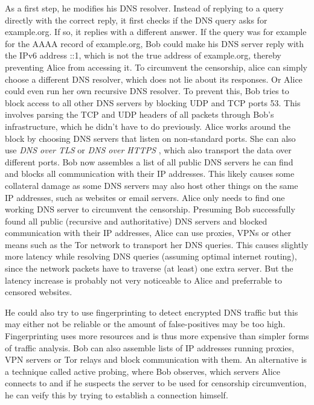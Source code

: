 As a first step, he modifies his DNS resolver.
Instead of replying to a query directly with the correct reply, it first checks if the DNS query asks for example.org.
If so, it replies with a different answer.
If the query was for example for the AAAA record of example.org, Bob could make his DNS server reply with the IPv6 address ::1, which is not the true address of example.org, thereby preventing Alice from accessing it.
To circumvent the censorship, alice can simply choose a different DNS resolver, which does not lie about its responses.
Or Alice could even run her own recursive DNS resolver.
To prevent this, Bob tries to block access to all other DNS servers by blocking UDP and TCP ports 53.
This involves parsing the TCP and UDP headers of all packets through Bob's infrastructure, which he didn't have to do previously.
Alice works around the block by choosing DNS servers that listen on non-standard ports.
She can also use \textit{DNS over TLS} \cite{wiki:DNS_over_TLS} or \textit{DNS over HTTPS} \cite{wiki:DNS_over_HTTPS}, which also transport the data over different ports.
Bob now assembles a list of all public DNS servers he can find and blocks all communication with their IP addresses.
This likely causes some collateral damage as some DNS servers may also host other things on the same IP addresses, such as websites or email servers.
Alice only needs to find one working DNS server to circumvent the censorship.
Presuming Bob successfully found all public (recursive and authoritative) DNS servers and blocked communication with their IP addresses, Alice can use proxies, VPNs or other means such as the Tor network to transport her DNS queries.
This causes slightly more latency while resolving DNS queries (assuming optimal internet routing), since the network packets have to traverse (at least) one extra server.
But the latency increase is probably not very noticeable to Alice and preferrable to censored websites.

He could also try to use fingerprinting to detect encrypted DNS traffic but this may either not be reliable or the amount of false-positives may be too high.
Fingerprinting uses more resources and is thus more expensive than simpler forms of traffic analysis.
Bob can also assemble lists of IP addresses running proxies, VPN servers or Tor relays and block communication with them.
An alternative is a technique called active probing, where Bob observes, which servers Alice connects to and if he suspects the server to be used for censorship circumvention, he can veify this by trying to establish a connection himself.

